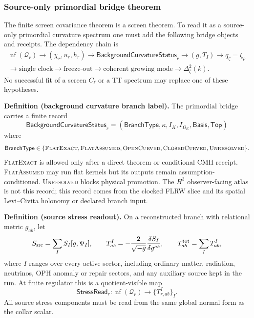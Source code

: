 \subsubsection{Source-only primordial bridge theorem}\label{subsec:primordial-bridge-theorems}

The finite screen covariance theorem is a screen theorem.  To read it as a
source-only primordial curvature spectrum one must add the following bridge
objects and receipts.  The dependency chain is
\[
\boxed{
\begin{gathered}
\operatorname{nf}(\mathcal Q_r)
\to
(\chi_r,u_r,h_r)
\to
\mathsf{BackgroundCurvatureStatus}_r
\to
(g,T_I)
\to
q_\zeta=\zeta_\rho\\
\to
\text{single clock}
\to
\text{freeze-out}
\to
\text{coherent growing mode}
\to
\Delta_\zeta^2(k).
\end{gathered}
}
\]
No successful fit of a screen \(C_\ell\) or a TT spectrum may replace one of
these hypotheses.

\textbf{Definition (background curvature branch label).}\label{def:background-curvature-branch-label}
The primordial bridge carries a finite record
\[
\mathsf{BackgroundCurvatureStatus}_r
=
(\mathsf{BranchType},\kappa,I_K,I_{\Omega_K},\mathsf{Basis},\mathsf{Top})
\]
where
\[
\mathsf{BranchType}\in
\{\textsc{FlatExact},\textsc{FlatAssumed},\textsc{OpenCurved},\textsc{ClosedCurved},\textsc{Unresolved}\}.
\]
\textsc{FlatExact} is allowed only after a direct theorem or conditional CMH receipt.  \textsc{FlatAssumed}
may run flat kernels but its outputs remain assumption-conditioned.  \textsc{Unresolved} blocks
physical promotion.  The \(H^3\) observer-facing atlas is not this record; this record comes from
the clocked FLRW slice and its spatial Levi--Civita holonomy or declared branch input.

\textbf{Definition (source stress readout).}\label{def:oph-source-stress}
On a reconstructed branch with relational metric \(g_{ab}\), let
\[
S_{\rm src}=\sum_I S_I[g,\Psi_I],
\qquad
T^I_{ab}=-\frac{2}{\sqrt{-g}}\frac{\delta S_I}{\delta g^{ab}},
\qquad
T^{\rm tot}_{ab}=\sum_I T^I_{ab},
\]
where \(I\) ranges over every active sector, including ordinary matter,
radiation, neutrinos, OPH anomaly or repair sectors, and any auxiliary source
kept in the run.  At finite regulator this is a quotient-visible map
\[
\mathsf{StressRead}_r:
\operatorname{nf}(\mathcal Q_r)\longrightarrow \{T^I_{r,ab}\}_I .
\]
All source stress components must be read from the same global normal form as
the collar scalar.

